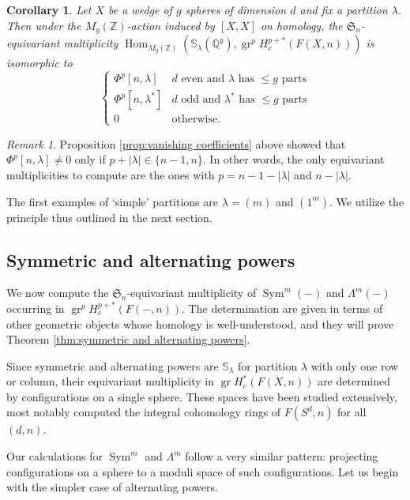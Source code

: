 \documentclass[12pt]{article}
\newcommand{\Z}{\mathbb{Z}}
\newcommand{\Q}{\mathbb{Q}}
\newcommand{\SymGroup}[1][n]{\mathfrak{S}_{#1}}
\newcommand{\TransposePartition}[1]{{#1}^{\ast}}
\newcommand{\Schur}[1]{\mathbb{S}_{#1}}
\DeclareMathOperator{\gr}{gr}
\DeclareMathOperator{\Hom}{Hom}
\DeclareMathOperator{\Sym}{Sym}
\theoremstyle{plain}
\newtheorem{cor}[thm]{Corollary}
\theoremstyle{definition}
\theoremstyle{remark}
\newtheorem{rmk}[thm]{Remark}
\begin{document}
\begin{cor}\label{cor:equivariant multiplicities}
Let $X$ be a wedge of $g$ spheres of dimension $d$ and fix a partition $\lambda$. Then under the $M_g(\Z)$-action induced by $[X,X]$ on homology, the $\SymGroup$-equivariant multiplicity $\Hom_{M_g(\Z)}\left( \Schur{\lambda}(\Q^g), \gr^p H^{p+*}_c(F(X,n)) \right)$ is isomorphic to
\begin{equation}
    \begin{cases}
    \Phi^p[n,\lambda] & d\text{ even and  $\lambda$ has $\leq g$ parts} \\
    \Phi^p[n,\TransposePartition{\lambda}] & d\text{ odd and  $\TransposePartition{\lambda}$ has $\leq g$ parts} \\
    0 & \text{otherwise}.
    \end{cases}
\end{equation}
\end{cor}

\begin{rmk}
Proposition \ref{prop:vanishing coefficients} above showed that $\Phi^p[n,\lambda] \neq 0$ only if $p+|\lambda| \in \{n-1,n\}$. In other words, the only equivariant multiplicities to compute are the ones with $p=n-1-|\lambda|$ and $n-|\lambda|$.
\end{rmk}

The first examples of `simple' partitions are $\lambda = (m)$ and $(1^m)$. We utilize the principle thus outlined in the next section.

\subsection{Symmetric and alternating powers}\label{sec:multiplicity symmetric powers}
We now compute the $\SymGroup$-equivariant multiplicity of $\Sym^m(-)$ and $\Lambda^m(-)$ occurring in $\gr^p H_c^{p+*}(F(-,n))$. The determination are given in terms of other geometric objects whose homology is well-understood, and they will prove Theorem \ref{thm:symmetric and alternating powers}.

Since symmetric and alternating powers are $\Schur{\lambda}$ for partition $\lambda$ with only one row or column, their equivariant multiplicity in $\gr H^*_c(F(X,n))$ are determined by configurations on a single sphere. These spaces have been studied extensively, most notably \cite{FZ00} computed the integral cohomology rings of $F(S^d,n)$ for all $(d,n)$.

Our calculations for $\Sym^m$ and $\Lambda^m$ follow a very similar pattern: projecting configurations on a sphere to a moduli space of such configurations. Let us begin with the simpler case of alternating powers.
\end{document}
